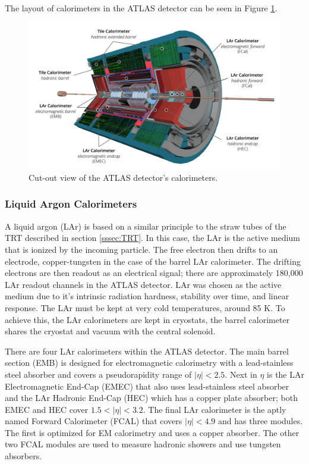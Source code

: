 	The layout of calorimeters in the ATLAS detector can be seen in Figure \ref{fig:calo-layout}.
	\begin{figure}[!ht]
	\centering
	\includegraphics[width=.85\textwidth,keepaspectratio=true]{chapters/chapter3_experiment/images/ATLAS_Calorimeters_Run3.png}
	\caption{ Cut-out view of the ATLAS detector's calorimeters.}
	\label{fig:calo-layout}
	\end{figure}

		\subsubsection{Liquid Argon Calorimeters}\label{sssec:LAr}
		A liquid argon (LAr) is based on a similar principle to the straw tubes of the TRT described in section \ref{sssec:TRT}. In this case, the LAr is the active medium that is ionized by the incoming particle. The free electron then drifts to an electrode, copper-tungsten in the case of the barrel LAr calorimeter. The drifting electrons are then readout as an electrical signal; there are approximately 180,000 LAr readout channels in the ATLAS detector. LAr was chosen as the active medium due to it's intrinsic radiation hardness, stability over time, and linear response. The LAr must be kept at very cold temperatures, around 85 K. To achieve this, the LAr calorimeters are kept in cryostats, the barrel calorimeter shares the cryostat and vacuum with the central solenoid.

		There are four LAr calorimeters within the ATLAS detector. The main barrel section (EMB) is designed for electromagnetic calorimetry with a lead-stainless steel absorber and covers a pseudorapidity range of $|\eta|<2.5$. Next in $\eta$ is the LAr Electromagnetic End-Cap (EMEC) that also uses lead-stainless steel absorber and the LAr Hadronic End-Cap (HEC) which has a copper plate absorber; both EMEC and HEC cover $1.5 < |\eta| < 3.2$. The final LAr calorimeter is the aptly named Forward Calorimeter (FCAL) that covers $|\eta|<4.9$ and has three modules. The first is optimized for EM calorimetry and uses a copper absorber. The other two FCAL modules are used to measure hadronic showers and use tungsten absorbers.

